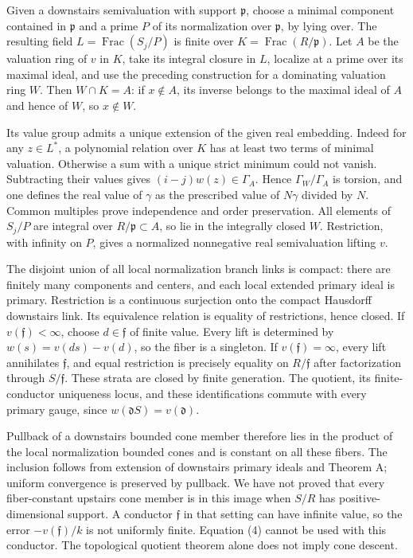 \documentclass[11pt]{article}
\begin{document}
Given a downstairs semivaluation with support \(\mathfrak p\), choose a minimal component contained in \(\mathfrak p\) and a prime \(P\) of its normalization over \(\mathfrak p\), by lying over. The resulting field \(L=\operatorname{Frac}(S_j/P)\) is finite over \(K=\operatorname{Frac}(R/\mathfrak p)\). Let \(A\) be the valuation ring of \(v\) in \(K\), take its integral closure in \(L\), localize at a prime over its maximal ideal, and use the preceding construction for a dominating valuation ring \(W\). Then \(W\cap K=A\): if \(x\notin A\), its inverse belongs to the maximal ideal of \(A\) and hence of \(W\), so \(x\notin W\).

Its value group admits a unique extension of the given real embedding. Indeed for any \(z\in L^*\), a polynomial relation over \(K\) has at least two terms of minimal valuation. Otherwise a sum with a unique strict minimum could not vanish. Subtracting their values gives \((i-j)w(z)\in\Gamma_A\). Hence \(\Gamma_W/\Gamma_A\) is torsion, and one defines the real value of \(\gamma\) as the prescribed value of \(N\gamma\) divided by \(N\). Common multiples prove independence and order preservation. All elements of \(S_j/P\) are integral over \(R/\mathfrak p\subset A\), so lie in the integrally closed \(W\). Restriction, with infinity on \(P\), gives a normalized nonnegative real semivaluation lifting \(v\).

The disjoint union of all local normalization branch links is compact: there are finitely many components and centers, and each local extended primary ideal is primary. Restriction is a continuous surjection onto the compact Hausdorff downstairs link. Its equivalence relation is equality of restrictions, hence closed. If \(v(\mathfrak f)<\infty\), choose \(d\in\mathfrak f\) of finite value. Every lift is determined by \(w(s)=v(ds)-v(d)\), so the fiber is a singleton. If \(v(\mathfrak f)=\infty\), every lift annihilates \(\mathfrak f\), and equal restriction is precisely equality on \(R/\mathfrak f\) after factorization through \(S/\mathfrak f\). These strata are closed by finite generation. The quotient, its finite-conductor uniqueness locus, and these identifications commute with every primary gauge, since \(w(\mathfrak dS)=v(\mathfrak d)\).

Pullback of a downstairs bounded cone member therefore lies in the product of the local normalization bounded cones and is constant on all these fibers. The inclusion follows from extension of downstairs primary ideals and Theorem A; uniform convergence is preserved by pullback. We have not proved that every fiber-constant upstairs cone member is in this image when \(S/R\) has positive-dimensional support. A conductor \(\mathfrak f\) in that setting can have infinite value, so the error \(-v(\mathfrak f)/k\) is not uniformly finite. Equation (4) cannot be used with this conductor. The topological quotient theorem alone does not imply cone descent.
\end{document}
